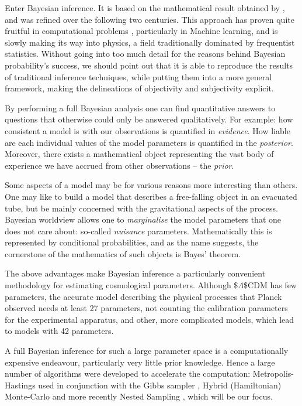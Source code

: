\documentclass[usenatbib]{mnras}
\begin{document}
Enter Bayesian inference. It is based on the mathematical result
obtained by \cite{1763}, and was refined over the following two
centuries. This approach has proven quite fruitful in computational
problems \citep{Wolpert2004}, particularly in Machine learning, and is
slowly making its way into physics, a field traditionally dominated
by frequentist statistics. Without going into too much detail for
the reasons behind Bayesian probability's success, we should point
out that it is able to reproduce the results of traditional
inference techniques, while putting them into a more general
framework, making the delineations of objectivity and subjectivity
explicit.


By performing a full Bayesian analysis one can find quantitative
answers to questions that otherwise could only be answered
qualitatively.  For example: how consistent a model is with our
observations is quantified in \emph{evidence}. How liable are each
individual values of the model parameters is quantified in the
\emph{posterior}. Moreover, there exists a mathematical object
representing  the vast body of experience we  have accrued from
other observations -- the \emph{prior}. 

Some aspects of a model may be for various reasons more interesting
than others. One may like to build a model that describes a
free-falling object in an evacuated tube, but be mainly concerned
with the gravitational aspects of the process. Bayesian worldview
allows one to \emph{marginalise} the model parameters that one does not
care about: so-called \emph{nuisance} parameters. Mathematically this is
represented by conditional probabilities, and as the name suggests,
the cornerstone of the mathematics of such objects is Bayes'
theorem. 

The above advantages make Bayesian inference a particularly
convenient methodology for estimating cosmological
parameters. Although \$\(\Lambda\)\$CDM has few parameters, the accurate
model describing the physical processes that Planck \citep{Planck}
observed needs at least 27 parameters, not counting the calibration
parameters for the experimental apparatus, and other, more
complicated models, which lead to models with 42 parameters.

A full Bayesian inference for such a large parameter space is a
computationally expensive endeavour, particularly very little prior
knowledge. Hence a large number of algorithms were developed to
accelerate the computation: Metropolis-Hastings \citep{Metropolis}
used in conjunction with the Gibbs sampler
\citep{Metropolis-Hastings-Gibbs}, Hybrid (Hamiltonian) Monte-Carlo
\citep{1701.02434,Duane_1987} and more recently Nested Sampling
\citep{Skilling2006}, which will be our focus.
\end{document}
